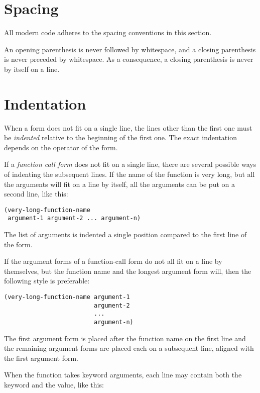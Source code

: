\section{Spacing}

All modern \commonlisp{} code adheres to the spacing conventions in
this section.

An opening parenthesis is never followed by whitespace, and a closing
parenthesis is never preceded by whitespace.  As a consequence, a
closing parenthesis is never by itself on a line. 

\section{Indentation}

When a form does not fit on a single line, the lines other than the
first one must be \emph{indented} relative to the beginning of the
first one.  The exact indentation depends on the operator of the
form.

If a \emph{function call form} does not fit on a single line, there
are several possible ways of indenting the subsequent lines.  If the
name of the function is very long, but all the arguments will fit on a
line by itself, all the arguments can be put on a second line, like
this:

\begin{verbatim}
(very-long-function-name
 argument-1 argument-2 ... argument-n)
\end{verbatim}

The list of arguments is indented a single position compared to the
first line of the form.

If the argument forms of a function-call form do not all fit on a line
by themselves, but the function name and the longest argument form
will, then the following style is preferable:

\begin{verbatim}
(very-long-function-name argument-1
                         argument-2
                         ...
                         argument-n)
\end{verbatim}

The first argument form is placed after the function name on the first
line and the remaining argument forms are placed each on a subsequent
line, aligned with the first argument form.

When the function takes keyword arguments, each line may contain both
the keyword and the value, like this:

